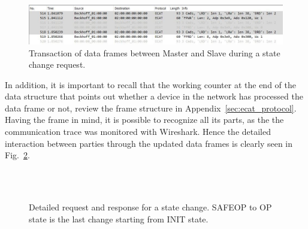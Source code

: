 \begin{figure}[h]
  \centering
  \includegraphics[width=\textwidth]{imgs/result-wireshark-preop-op1.JPG}
  \caption{Transaction of data frames between Master and Slave during a state change request.}
  \label{fig:ecat_wireshark}
\end{figure}

In addition, it is important to 
recall that the working counter at the end of the data structure that points out whether a device in the network has processed 
the data frame or not, review the frame structure in Appendix~\ref{sec:ecat_protocol}. Having the frame in mind, it is possible to 
recognize all its parts, as the the communication trace was monitored with Wireshark. Hence the detailed interaction between parties 
through the updated data frames is clearly seen in Fig.~\ref{fig:ecat_wireshark2}.


\begin{figure}[ht]
  \centering
  \\
  \\
  \caption{Detailed request and response for a state change. SAFEOP to OP state is the last change starting from INIT state.} %
  \label{fig:ecat_wireshark2}
\end{figure}

